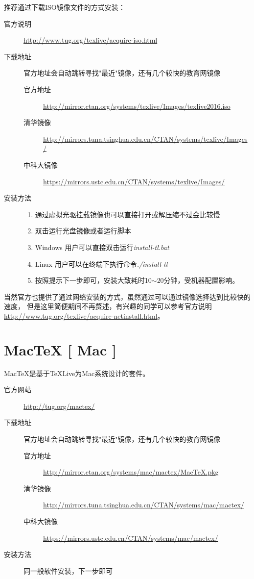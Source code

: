 推荐通过下载ISO镜像文件的方式安装：
\begin{description}
    \item[官方说明]
        \url{http://www.tug.org/texlive/acquire-iso.html}
    \item[下载地址] 官方地址会自动跳转寻找"最近"镜像，还有几个较快的教育网镜像
    \begin{description}
        \item[官方地址]
            \url{http://mirror.ctan.org/systems/texlive/Images/texlive2016.iso}
        \item[清华镜像]
            \url{http://mirrors.tuna.tsinghua.edu.cn/CTAN/systems/texlive/Images/}
        \item[中科大镜像]
            \url{https://mirrors.ustc.edu.cn/CTAN/systems/texlive/Images/}
    \end{description}
    \item[安装方法] \hfill
    \begin{enumerate}
        \item 通过虚拟光驱挂载镜像也可以直接打开或解压缩不过会比较慢
        \item 双击运行光盘镜像或者运行脚本
        \item[] Windows 用户可以直接双击运行\textsl{install-tl.bat}
        \item[] Linux 用户可以在终端下执行命令\textsl{./install-tl}
        \item 按照提示下一步即可，安装大致耗时10$\sim$20分钟，受机器配置影响。
    \end{enumerate}
\end{description}

当然官方也提供了通过网络安装的方式，虽然通过可以通过镜像选择达到比较快的速度，
但是这里简便期间不再赘述，有兴趣的同学可以参考官方说明
\url{http://www.tug.org/texlive/acquire-netinstall.html}。

\section{Mac\TeX{} [ Mac ]}

Mac\TeX{}是基于\TeX{}Live为Mac系统设计的套件。

\begin{description}
    \item[官方网站]
        \url{http://tug.org/mactex/}
    \item[下载地址] 官方地址会自动跳转寻找"最近"镜像，还有几个较快的教育网镜像
    \begin{description}
        \item[官方地址]
            \url{http://mirror.ctan.org/systems/mac/mactex/MacTeX.pkg}
        \item[清华镜像]
            \url{http://mirrors.tuna.tsinghua.edu.cn/CTAN/systems/mac/mactex/}
        \item[中科大镜像]
            \url{https://mirrors.ustc.edu.cn/CTAN/systems/mac/mactex/}
    \end{description}
    \item[安装方法] 同一般软件安装，下一步即可
\end{description}

